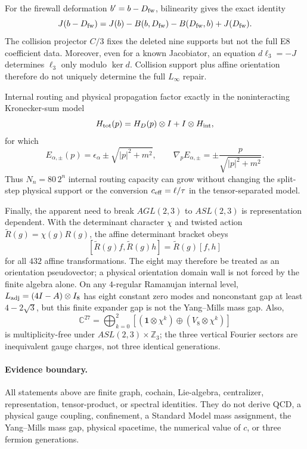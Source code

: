 For the firewall deformation $b'=b-D_{\rm fw}$, bilinearity gives the exact identity
\[
 J(b-D_{\rm fw})=J(b)-B(b,D_{\rm fw})-B(D_{\rm fw},b)+J(D_{\rm fw}).
\]
The collision projector $C/3$ fixes the deleted nine supports but not the full E8
coefficient data.  Moreover, even for a known Jacobiator, an equation
$d\ell_3=-J$ determines $\ell_3$ only modulo $\ker d$.  Collision support plus
affine orientation therefore do not uniquely determine the full $L_\infty$ repair.

Internal routing and physical propagation factor exactly in the noninteracting
Kronecker-sum model
\[
 H_{\rm tot}(p)=H_D(p)\otimes I+I\otimes H_{\rm int},
\]
for which
\[
 E_{\alpha,\pm}(p)=\epsilon_\alpha\pm\sqrt{|p|^2+m^2},\qquad
 \nabla_pE_{\alpha,\pm}=\pm\frac{p}{\sqrt{|p|^2+m^2}}.
\]
Thus $N_n=80\,2^n$ internal routing capacity can grow without changing the split-step
physical support or the conversion $c_{\rm eff}=\ell/\tau$ in the tensor-separated
model.

Finally, the apparent need to break $AGL(2,3)$ to $ASL(2,3)$ is representation
 dependent.  With the determinant character $\chi$ and twisted action
$\widetilde R(g)=\chi(g)R(g)$, the affine determinant bracket obeys
\[
 [\widetilde R(g)f,\widetilde R(g)h]=\widetilde R(g)[f,h]
\]
for all $432$ affine transformations.  The eight may therefore be treated as an
orientation pseudovector; a physical orientation domain wall is not forced by the
finite algebra alone.  On any $4$-regular Ramanujan internal level,
$L_{\rm adj}=(4I-A)\otimes I_8$ has eight constant zero modes and nonconstant gap at
least $4-2\sqrt3$, but this finite expander gap is not the Yang--Mills mass gap.
Also,
\[
 \mathbb C^{27}=\bigoplus_{k=0}^2
 \left[(\mathbf1\otimes\chi^k)\oplus(V_8\otimes\chi^k)\right]
\]
is multiplicity-free under $ASL(2,3)\times\mathbb Z_3$; the three vertical Fourier
sectors are inequivalent gauge charges, not three identical generations.

\paragraph{Evidence boundary.}
All statements above are finite graph, cochain, Lie-algebra, centralizer,
representation, tensor-product, or spectral identities.  They do not derive QCD,
a physical gauge coupling, confinement, a Standard Model mass assignment, the
Yang--Mills mass gap, physical spacetime, the numerical value of $c$, or three
fermion generations.
